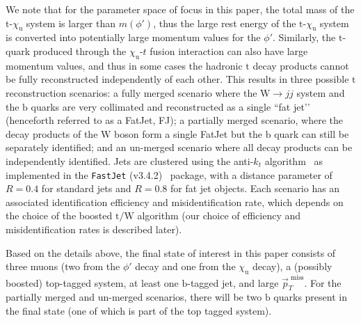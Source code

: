 We note that for the parameter space of focus in this paper, the total mass of the $\mathrm{t}$-$\chi_\mathrm{u}$ system is larger than $m(\phi')$, thus the large rest energy of the $\mathrm{t}$-$\chi_\mathrm{u}$ system is converted into potentially large momentum values for the $\phi'$. Similarly, the $\mathrm{t}$-quark produced through the $\chi_\mathrm{u}$-$t$ fusion interaction can also have large momentum values, and thus in some cases the hadronic $\mathrm{t}$ decay products cannot be fully reconstructed independently of each other. This results in three possible $\mathrm{t}$ reconstruction scenarios: a fully merged scenario where the $\mathrm{W}\to jj$ system and the $\mathrm{b}$ quarks are very collimated and reconstructed as a single ``fat jet’’ (henceforth referred to as a FatJet, FJ); a partially merged scenario, where the decay products of the $\mathrm{W}$ boson form a single FatJet but the $\mathrm{b}$ quark can still be separately identified; and an un-merged scenario where all decay products can be independently identified. Jets are clustered  using the  anti-$k_t$ algorithm~\parencite{Cacciari_2008} as implemented in the \texttt{FastJet} (v3.4.2)~\parencite{Cacciari_2012} package, with a distance parameter of $R = 0.4$ for standard jets and $R = 0.8$ for fat jet objects. Each scenario has an associated identification efficiency and misidentification rate, which depends on the choice of the boosted $\mathrm{t/W}$ algorithm (our choice of efficiency and misidentification rates is described later). 

Based on the details above, the final state of interest in this paper consists of three muons (two from the $\phi'$ decay and one from the $\chi_\mathrm{u}$ decay), a (possibly boosted) top-tagged system, at least one $\mathrm{b}$-tagged jet, and large $\vec{p}_{T}^{\textrm{~miss}}$. For the partially merged and un-merged scenarios, there will be two $\mathrm{b}$ quarks present in the final state (one of which is part of the top tagged system). 

